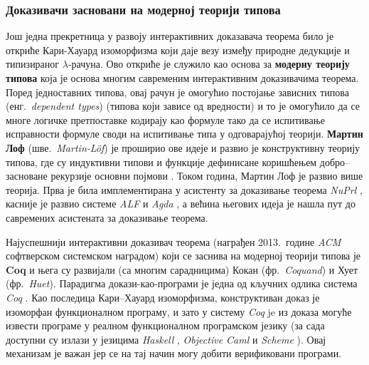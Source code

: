 \subsubsection{Доказивачи засновани на модерној теорији типова}

Још једна прекретница у развоју интерактивних доказавача теорема било
је откриће Кари-Хауард изоморфизма који даје везу између природне
дедукције и типизираног $\lambda$-рачуна. Ово откриће је служило као
основа за \textbf{модерну теорију типова} која је основа многим
савременим интерактивним доказивачима теорема. Поред једноставних
типова, овај рачун је омогућио постојање зависних типова
(енг.~\emph{dependent types}) (типова који зависе од вредности) и то
је омогућило да се многе логичке претпоставке кодирају као формуле
тако да се испитивање исправности формуле своди на испитивање типа у
одговарајућој теорији. \textbf{Мартин Лоф} (шве.~\emph{Martin-L\"of})
је проширио ове идеје и развио је конструктивну теорију типова, где су
индуктивни типови и функције дефинисане коришћењем добро--засноване
рекурзије основни појмови \cite{martinlof, martinlof2}. Током година,
Мартин Лоф је развио више теорија. Прва је била имплементирана у
асистенту за доказивање теорема \emph{NuPrl} \cite{nuprl86}, касније
је развио системе \emph{ALF} \cite{alf1994} и \emph{Agda}
  \cite{agda}, а већина његових идеја је нашла пут до савремених
  асистената за доказивање теорема.

Најуспешнији интерактивни доказивач теорема (награђен 2013.~године
\emph{ACM} софтверском системском наградом) који се заснива на
модерној теорији типова је \textbf{Coq} и њега су развијали (са многим
сарадницима) Кокан (фр.~\emph{Coquand}) и Хует
(фр.~\emph{Huet}). Парадигма докази-као-програми је једна од кључних
одлика система \emph{Coq} \cite{letouzey2002new}. Као последица
Кари--Хауард изоморфизма, конструктиван доказ је изоморфан
функционалном програму, и зато у систему \emph{Coq} je из доказа
могуће извести програме у реалном функционалном програмском језику (за
сада доступни су излази у језицима \emph{Haskell}
\cite{hudak1992report}, \emph{Objective Caml} \cite{leroy2014ocaml} и
\emph{Scheme} \cite{sperber2007revised6}). Овај механизам је важан јер
се на тај начин могу добити верификовани програми.


